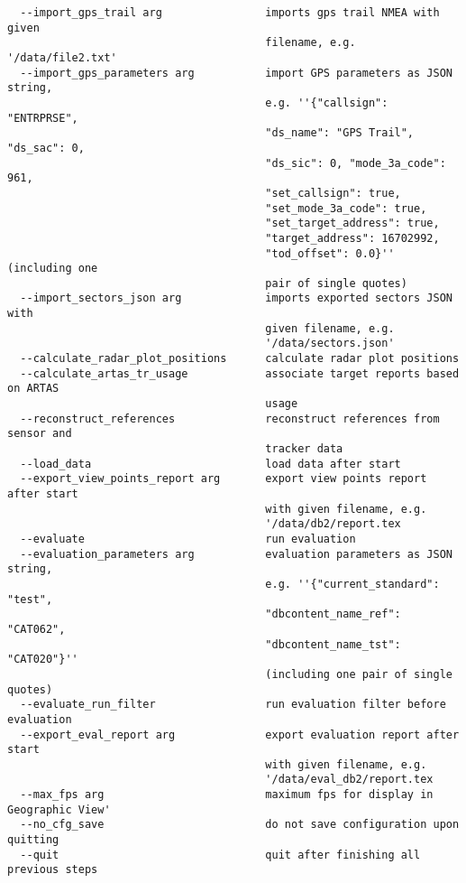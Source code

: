 \begin{lstlisting}
  --import_gps_trail arg                imports gps trail NMEA with given 
                                        filename, e.g. '/data/file2.txt'
  --import_gps_parameters arg           import GPS parameters as JSON string, 
                                        e.g. ''{"callsign": "ENTRPRSE", 
                                        "ds_name": "GPS Trail", "ds_sac": 0, 
                                        "ds_sic": 0, "mode_3a_code": 961, 
                                        "set_callsign": true, 
                                        "set_mode_3a_code": true, 
                                        "set_target_address": true, 
                                        "target_address": 16702992, 
                                        "tod_offset": 0.0}'' (including one 
                                        pair of single quotes)
  --import_sectors_json arg             imports exported sectors JSON with 
                                        given filename, e.g. 
                                        '/data/sectors.json'
  --calculate_radar_plot_positions      calculate radar plot positions
  --calculate_artas_tr_usage            associate target reports based on ARTAS
                                        usage  
  --reconstruct_references              reconstruct references from sensor and 
                                        tracker data
  --load_data                           load data after start
  --export_view_points_report arg       export view points report after start 
                                        with given filename, e.g. 
                                        '/data/db2/report.tex
  --evaluate                            run evaluation
  --evaluation_parameters arg           evaluation parameters as JSON string, 
                                        e.g. ''{"current_standard": "test", 
                                        "dbcontent_name_ref": "CAT062", 
                                        "dbcontent_name_tst": "CAT020"}'' 
                                        (including one pair of single quotes)
  --evaluate_run_filter                 run evaluation filter before evaluation
  --export_eval_report arg              export evaluation report after start 
                                        with given filename, e.g. 
                                        '/data/eval_db2/report.tex
  --max_fps arg                         maximum fps for display in Geographic View'
  --no_cfg_save                         do not save configuration upon quitting
  --quit                                quit after finishing all previous steps

\end{lstlisting}
\ \\

